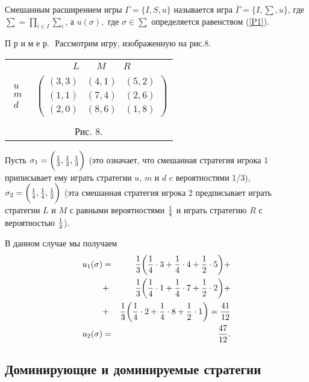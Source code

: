 \documentclass[12pt]{article}
\begin{document}
\begin{definition}
Смешанным расширением игры $\Gamma=\{I,S,u\}$ называется игра
$\bar\Gamma=\{I,\sum,u\}$,  где $\sum=\prod_{i\in I}\sum_i$, а
$u(\sigma),$ где $\sigma\in\sum$ определяется равенством
(\ref{P1}).
\end{definition}

П р и м е р.\,\,  Рассмотрим игру, изображенную на рис.8.

\begin{center}
\begin{tabular}{cc}
&$\begin{array}{ccc} L\quad &M& \quad R \end{array}$\\
$\begin{array}{c} u\\m\\d \end{array}$& $\left(
\begin{array}{ccc}
(3,3)&(4,1)&(5,2)\\
(1,1)&(7,4)&(2,6)\\
(2,0)&(8,6)&(1,8)\end{array}\right)$\\
\multicolumn{2}{c}{}\\
\multicolumn{2}{c}{Рис. 8.}\\
\end{tabular}
\end{center}

Пусть $\sigma_1=\biggl({1\over  3},{1\over 3},{1\over 3}\biggr)$
(это означает, что смешанная стратегия игрока 1 приписывает ему
играть стратегии $u$, $m$  и $d$  c вероятностями  1/3),
$\sigma_2=\biggl({1\over  4}, {1\over  4},{1\over 2}\biggr)$ (эта смешанная
стратегия игрока 2 предписывает играть стратегии $L$ и $M$ с равными
вероятностями ${1\over  4}$ и играть стратегию $R$ с вероятностью ${1\over 2}$).

В данном случае мы получаем
\begin{eqnarray}\nonumber
u_1(\sigma)&=&{1\over 3}\biggl({1\over  4}\cdot 3+{1\over 4}\cdot 4+ {1\over
2}\cdot 5\biggr)+\cr &+&{1\over 3}\biggl({1\over  4}\cdot 1+{1\over 4}\cdot 7+
{1\over 2}\cdot 2\biggr)+\cr &+&{1\over 3}\biggl({1\over  4}\cdot 2+{1\over
4}\cdot 8+ {1\over 2}\cdot 1\biggr)={41\over 12}\cr
u_2(\sigma)&=&{47\over 12}.
\end{eqnarray}

\subsection{Доминирующие и доминируемые стратегии}
\end{document}
